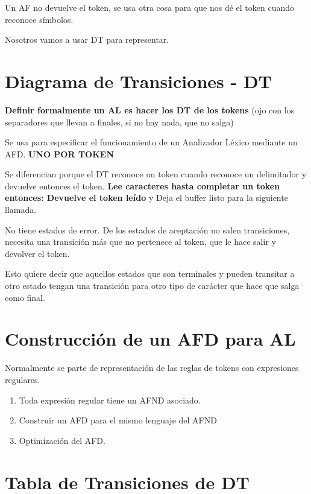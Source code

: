 \documentclass[12pt, twoside, openright]{report} %
\begin{document}
Un AF no devuelve el token, se usa otra cosa para que nos dé el token
cuando reconoce símbolos.

Nosotros vamos a usar DT para representar.


\section{Diagrama de Transiciones - DT}

\textbf{Definir formalmente un AL es hacer los DT de los tokens} (ojo
con los separadores que llevan a finales, si no hay nada, que no salga)

Se usa para especificar el funcionamiento de un Analizador Léxico
mediante un AFD. \textbf{UNO POR TOKEN}

Se diferencian porque el DT reconoce un token cuando reconoce un
delimitador y devuelve entonces el token. \textbf{Lee caracteres hasta
completar un token entonces: Devuelve el token leído} y Deja el buffer
listo para la siguiente llamada.

No tiene estados de error. De los estados de aceptación no salen
transiciones, necesita una transición más que no pertenece al token, que
le hace salir y devolver el token.

Esto quiere decir que aquellos estados que son terminales y pueden
transitar a otro estado tengan una transición para otro tipo de carácter
que hace que salga como final.

\section{Construcción de un AFD para AL}

Normalmente se parte de representación de las reglas de tokens con
expresiones regulares.

\begin{enumerate}
\def\labelenumi{\arabic{enumi}.}

\item
  Toda expresión regular tiene un AFND asociado.
\item
  Construir un AFD para el mismo lenguaje del AFND
\item
  Optimización del AFD.
\end{enumerate}


\section{Tabla de Transiciones de DT}
\end{document}
